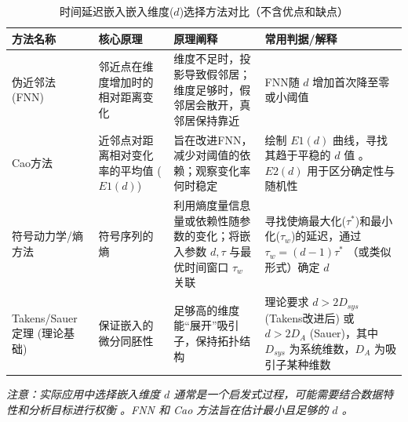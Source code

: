 \begin{table}[h!] %
    \centering %
    \caption{时间延迟嵌入嵌入维度($d$)选择方法对比（不含优点和缺点）}
    \label{tab:embedding_dimension_methods_no_pros_cons_new}
    \begin{tabular}{
        >{\raggedright\arraybackslash}m{3cm} %
        >{\raggedright\arraybackslash}m{4.5cm} %
        >{\raggedright\arraybackslash}m{5cm}  %
        >{\raggedright\arraybackslash}m{4cm}  %
        }
        \toprule %
        \textbf{方法名称}                        & \textbf{核心原理}             & \textbf{原理阐释}                                          & \textbf{常用判据/解释}                                                                       \\
        \midrule %

        伪近邻法 (FNN) \cite{rhodes1997false}    & 邻近点在维度增加时的相对距离变化          & 维度不足时，投影导致假邻居；维度足够时，假邻居会散开，真邻居保持靠近                     & FNN随 $d$ 增加首次降至零或小阈值                                                                   \\
        \addlinespace %

        Cao方法\cite{cao1997practical}         & 近邻点对距离相对变化率的平均值 ($E1(d)$) & 旨在改进FNN，减少对阈值的依赖；观察变化率何时稳定                             & 绘制 $E1(d)$ 曲线，寻找其趋于平稳的 $d$ 值 。$E2(d)$ 用于区分确定性与随机性                                      \\
        \addlinespace

        符号动力学/熵方法\cite{matilla2021selection} & 符号序列的熵                    & 利用熵度量信息量或依赖性随参数的变化；将嵌入参数 $d, \tau$ 与最优时间窗口 $\tau_w$ 关联 & 寻找使熵最大化($\tau^*$)和最小化($\tau_w$)的延迟，通过 $\tau_w=(d-1)\tau^*$ （或类似形式）确定 $d$               \\
        \addlinespace

        Takens/Sauer 定理 (理论基础)               & 保证嵌入的微分同胚性                & 足够高的维度能“展开”吸引子，保持拓扑结构                                  & 理论要求 $d > 2D_{sys}$ (Takens改进后) 或 $d > 2D_A$ (Sauer)，其中 $D_{sys}$ 为系统维数，$D_A$ 为吸引子某种维数 \\

        \bottomrule %
    \end{tabular}
    \par %
    \vspace{0.5cm} %
    \textit{注意：实际应用中选择嵌入维度 $d$ 通常是一个启发式过程，可能需要结合数据特性和分析目标进行权衡 。FNN 和 Cao 方法旨在估计最小且足够的 $d$ 。}
\end{table}
